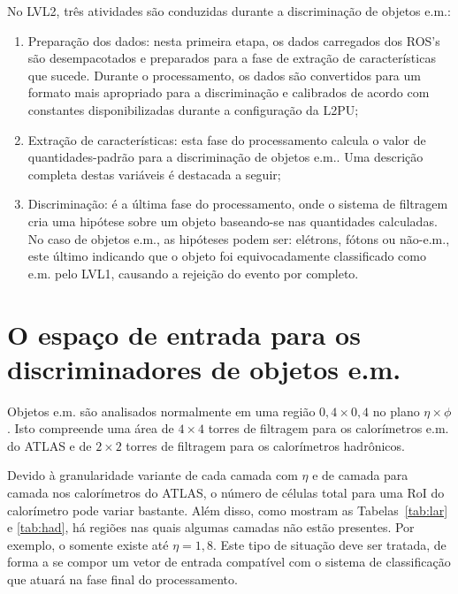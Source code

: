 No LVL2, três atividades são conduzidas durante a discriminação de objetos
e.m.:

\begin{enumerate}
\item Preparação dos dados: nesta primeira etapa, os dados carregados dos
ROS's são desempacotados e preparados para a fase de extração de
características que sucede. Durante o processamento, os dados são convertidos
para um formato mais apropriado para a discriminação e calibrados de acordo
com constantes disponibilizadas durante a configuração da L2PU;

\item Extração de características: esta fase do processamento calcula o valor
de quantidades-padrão para a discriminação de objetos e.m.. Uma descrição
completa destas variáveis é destacada a seguir;

\item Discriminação: é a última fase do processamento, onde o sistema de
filtragem cria uma hipótese sobre um objeto baseando-se nas quantidades
calculadas. No caso de objetos e.m., as hipóteses podem ser: elétrons, fótons
ou não-e.m., este último indicando que o objeto foi equivocadamente
classificado como e.m. pelo LVL1, causando a rejeição do evento por completo.
\end{enumerate}


\section{O espaço de entrada para os discriminadores de objetos e.m.}
\label{sec:datainput}

Objetos e.m. são analisados normalmente em uma região $0,4\times0,4$ no plano
$\eta\times\phi$. Isto compreende uma área de $4\times4$ torres de filtragem
para os calorímetros e.m. do ATLAS e de $2\times2$ torres de filtragem para os
calorímetros hadrônicos.

Devido à granularidade variante de cada camada com $\eta$ e de camada para
camada nos calorímetros do ATLAS, o número de células total para uma RoI do
calorímetro pode variar bastante. Além disso, como mostram as
Tabelas~\ref{tab:lar} e \ref{tab:had}, há regiões nas quais algumas camadas
não estão presentes. Por exemplo, o  somente existe até
$\eta=1,8$. Este tipo de situação deve ser tratada, de forma a se compor um
vetor de entrada compatível com o sistema de classificação que atuará na fase
final do processamento.

